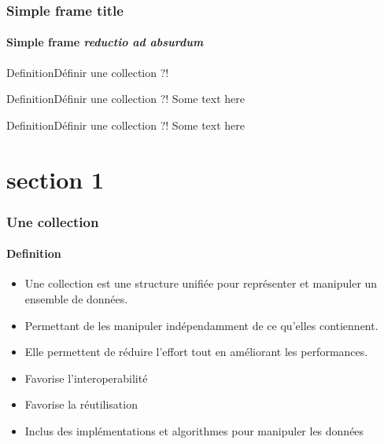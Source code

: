 





\begin{frame}[plain]
	\titlepage{}
\end{frame}

\begin{frame}[allowframebreaks]
	\frametitle{Simple frame title}
	\framesubtitle{Simple frame \textit{reductio ad absurdum}}
\end{frame}

\begin{sepframe}{Definition}{Définir une collection ?!}

\end{sepframe}

\begin{sepFrameA}{Definition}{Définir une collection ?!}
Some text here
\end{sepFrameA}

\begin{sepFrameB}{Definition}{Définir une collection ?!}
    Some text here
\end{sepFrameB}

\section{section 1}
\begin{frame}
	\frametitle{Une collection}
    \framesubtitle{Definition}

    \begin{itemize}
        \item Une collection est une structure unifiée pour représenter et manipuler un ensemble de données.
        \item Permettant de les manipuler indépendamment de ce qu'elles contiennent.
        \item Elle permettent de réduire l'effort tout en améliorant les performances\footnotemark.
        \item Favorise l'interoperabilité
        \item Favorise la réutilisation
        \item Inclus des implémentations et algorithmes pour manipuler les données
    \end{itemize}

\end{frame}


